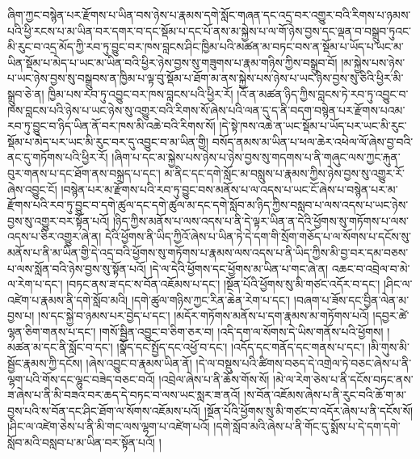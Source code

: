 ཞིག་ཀྱང་བསྙེན་པར་རྫོགས་པ་ཡིན་བས་ཉེས་པ་རྣམས་དགེ་སློང་གཞན་དང་འདྲ་བར་འགྱུར་བའི་རིགས་པ་ཉམས་པའི་ཕྱི་རངས་པ་མ་ཡིན་བར་དགར་བ་དང་སྡོམ་པ་དང་པོ་ནས་མ་སྐྱེས་པ་ལ་གོ་ཉེས་བྱས་དང་ལྡན་བ་བསྒྲུབ་ཏུའང་མི་རུང་བ་འདྲ་མོད་ཀྱི་རབ་ཏུ་བྱུང་བར་ཁས་བླངས་ཤིང་ཁྱིམ་པའི་མཚན་མ་བཏང་བས་ན་སྡོམ་པ་ཡོད་པ་ཡང་མ་ཡིན་སྡོམ་པ་མེད་པ་ཡང་མ་ཡིན་བའི་ཕྱིར་ཉེས་བྱས་སུ་གཟུགས་པ་རྣམ་གཉིས་ཀྱིས་བསྒྲུབ་བོ། །མ་སྐྱེས་པས་ཉེས་པ་ཡང་ཉེས་བྱས་སུ་བསྒྲུབས་ན་ཁྱིམ་པ་ལྟ་བུ་སྡོམ་པ་ཐོག་མ་ནས་སྐྱེས་པས་ཉེས་པ་ཡང་ཉེས་བྱས་སུ་ཅིའི་ཕྱིར་མི་སྒྲུབ་ཅེ་ན། ཁྱིམ་པས་རབ་ཏུ་འབྱུང་བར་ཁས་བླངས་པའི་ཕྱིར་རོ། །འོ་ན་མཚན་ཉིད་ཀྱིས་བླངས་ཏེ་རབ་ཏུ་འབྱུང་བ་ཁས་བླངས་པའི་ཉེས་པ་ཡང་ཉེས་སུ་འགྱུར་བའི་རིགས་སོ་ཞེས་པའི་ལན་དུ་ད་ནི་བདག་བསྙེན་པར་རྫོགས་པའམ་རབ་ཏུ་བྱུང་བ་ཉིད་ཡིན་ནོ་བར་ཁས་མི་འཆེ་བའི་རིགས་སོ། །དེ་སྟེ་ཁས་འཆེ་ན་ཡང་སྡོམ་པ་ཡོད་པར་ཡང་མི་རུང་སྡོམ་པ་མེད་པར་ཡང་མི་རུང་བར་དུ་འབྱུང་བ་མ་ཡིན་གྱི། བསོད་ནམས་མ་ཡིན་པ་ཕལ་ཆེར་འཕེལ་ལོ་ཞེས་བྱ་བའི་ནང་དུ་གཏོགས་པའི་ཕྱིར་རོ། །ཞིག་པ་དང་མ་སྐྱེས་པས་ཉེས་པ་ཉེས་བྱས་སུ་གདགས་པ་ནི་གཞུང་ལས་ཀྱང་རྐུན་བུར་གནས་པ་དང་ཐོག་ནས་བསྐྲད་པ་དང་། མ་ནིང་དང་དགེ་སློང་མ་བསླུས་པ་རྣམས་ཀྱིས་ཉེས་བྱས་སུ་འགྱུར་རོ་ཞེས་འབྱུང་ངོ། །བསྙེན་པར་མ་རྫོགས་པའི་རབ་ཏུ་བྱུང་བས་མནོས་པ་ལ་འདས་པ་ཡང་ངོ་ཞེས་པ་བསྙེན་པར་མ་རྫོགས་པའི་རབ་ཏུ་བྱུང་བ་དགེ་ཚུལ་དང་དགེ་ཚུལ་མ་དང་དགེ་སློབ་མ་ཉིད་ཀྱིས་བསླབ་པ་ལས་འདས་པ་ཡང་ཉེས་བྱས་སུ་འགྱུར་བར་སྟོན་པའོ། །ཉིད་ཀྱིས་མནོས་པ་ལས་འདས་པ་ནི་དེ་ལྟར་ཡིན་ན་དེའི་ཕྱོགས་སུ་གཏོགས་པ་ལས་འདས་པ་ཅིར་འགྱུར་ཞེ་ན། དེའི་ཕྱོགས་ནི་ཡིད་ཀྱིའོ་ཞེས་པ་ཡིན་ཏེ་དེ་དག་གི་སྲོག་གཅོད་པ་ལ་སོགས་པ་དངོས་སུ་མནོས་པ་ནི་མ་ཡིན་གྱི་དེ་འདྲ་བའི་ཕྱོགས་སུ་གཏོགས་པ་རྣམས་ལས་འདས་པ་ནི་ཡིད་ཀྱིས་མི་བྱ་བར་དམ་བཅས་པ་ལས་སློན་བའི་ཉེས་བྱས་སུ་སྟོན་པའོ། །དེ་ལ་དེའི་ཕྱོགས་དང་ཕྱོགས་མ་ཡིན་པ་གང་ཞེ་ན། འཆང་བ་འབྲེལ་བ་མེ་ལ་རེག་པ་དང་། །བཏང་ནས་ཟ་དང་ས་བོན་འཇོམས་པ་དང་། །སྔོན་པོའི་ཕྱོགས་སུ་མི་གཙང་འདོར་བ་དང་། །ཤིང་ལ་འཛེག་པ་རྣམས་ནི་དགེ་སློབ་མའི། །དགེ་ཚུལ་གཉིས་ཀྱང་རིན་ཆེན་རེག་པ་དང་། །བཞག་པ་ཟོས་དང་བྱིན་ལེན་མ་བྱས་པ། །ས་དང་སྐྱེ་བ་ཉམས་པར་བྱེད་པ་དང་། །མདོར་གཏོགས་མནོས་པ་དག་རྣམས་མ་གཏོགས་པའོ། །དབྱར་ཚེ་ལྷན་ཅིག་གནས་པ་དང་། །གསོ་སྦྱིན་འབྱུང་བ་ཅིག་ཅར་བ། །འདི་དག་ལ་སོགས་དེ་ཡིས་གནོས་པའི་ཕྱོགས། །མཚན་མ་དང་ནི་སློང་བ་དང་། །སྣོད་དང་སྤྱོད་དང་འཕྱོ་བ་དང་། །འདོད་དང་གནོད་དང་གནས་པ་དང་། །མི་གུས་མི་སྦྱོང་རྣམས་ཀྱི་དངོས། །ཞེས་འབྱུང་བ་རྣམས་ཡིན་ནོ། །དེ་ལ་བསྡུས་པའི་ཚིགས་བཅད་དེ་འགྲེལ་ཏེ་བཅང་ཞེས་པ་ནི་ལྷག་པའི་གོས་དང་ལྷུང་བཟེད་བཅང་བའོ། །འབྲེལ་ཞེས་པ་ནི་ཆོས་གོས་སོ། །མེ་ལ་རེག་ཅེས་པ་ནི་དངོས་བཏང་ནས་ཟ་ཞེས་པ་ནི་མི་བཟའ་བར་ཆད་དེ་བཏང་བ་ལས་ཡང་སླར་ཟ་ནའོ། །ས་བོན་འཇོམས་ཞེས་པ་ནི་རུང་བའི་ཆོ་ག་མ་བྱས་པའི་ས་བོན་དང་ཤིང་ཐོག་ལ་སོགས་འཇོམས་པའོ། །སྔོན་པོའི་ཕྱོགས་སུ་མི་གཙང་བ་འདོར་ཞེས་པ་ནི་དངོས་སོ། །ཤིང་ལ་འཛེག་ཅེས་པ་ནི་མི་གང་ལས་ལྷག་པ་འཛེག་པའོ། །དགེ་སློབ་མའི་ཞེས་པ་ནི་གོང་དུ་སྨོས་པ་དེ་དག་དགེ་སློབ་མའི་བསླབ་པ་མ་ཡིན་བར་སྟོན་པའོ། །
